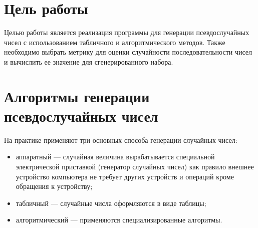 \section*{Цель работы}

Целью работы является реализация программы для генерации псевдослучайных чисел
с использованием табличного и алгоритмического методов. Также необходимо
выбрать метрику для оценки случайности последовательности чисел и вычислить ее
значение для сгенерированного набора.

\section*{Алгоритмы генерации псевдослучайных чисел}

На практике применяют три основных способа генерации случайных чисел:
\begin{itemize}
    \item аппаратный --- случайная величина вырабатывается специальной
          электрической приставкой (генератор случайных чисел) как правило
          внешнее устройство компьютера не требует других устройств и операций
          кроме обращения к устройству;
    \item табличный --- случайные числа оформляются в виде таблицы;
    \item алгоритмический --- применяются специализированные алгоритмы.
\end{itemize}

